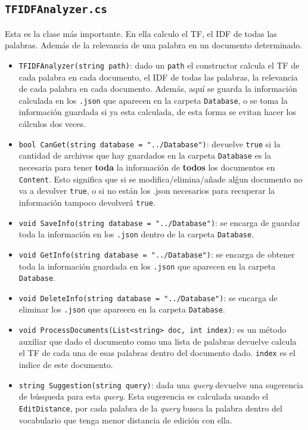\documentclass{report}
\begin{document}
\subsection*{\tt TFIDFAnalyzer.cs}

Esta es la clase m\'as importante. En ella calculo el TF, el IDF de todas las palabras. 
Adem\'as de la relevancia de una palabra en un documento determinado.

\begin{itemize}
	\item {\tt TFIDFAnalyzer(string path)}: dado un {\tt path} el constructor calcula el TF 
	de cada palabra en cada documento, el IDF de todas las palabras, la relevancia de cada 
	palabra en cada documento. Adem\'as, aqu\'i se guarda la informaci\'on calculada en los 
	{\tt .json} que aparecen en la carpeta {\tt Database}, o se toma la informaci\'on guardada 
	si ya esta calculada, de esta forma se evitan hacer los c\'alculos dos veces.
	\item {\tt bool CanGet(string database = "../Database")}: devuelve {\tt true} si la cantidad
de archivos que hay guardados en la carpeta {\tt Database} es la necesaria para tener {\bf toda} 
la informaci\'on de {\bf todos} los documentos en {\tt Content}. Esto significa que si se modifica/elimina/a\~nade 
al\'gun documento no va a devolver {\tt true}, o si no est\'an los {.json} necesarios
para recuperar la informaci\'on tampoco devolver\'a {\tt true}.
	\item {\tt void SaveInfo(string database = "../Database")}: se encarga de guardar toda la informaci\'on en los {\tt .json} dentro de la carpeta {\tt Database}.
	\item {\tt void GetInfo(string database = "../Database")}: se encarga de obtener toda la informaci\'on guardada en los {\tt .json} que aparecen en la carpeta {\tt Database}.
	\item {\tt void DeleteInfo(string database = "../Database")}: se encarga de eliminar los {\tt .json} que aparecen en la carpeta {\tt Database}.
	\item {\tt void ProcessDocuments(List<string> doc, int index)}: es un m\'etodo auxiliar que dado el documento como una lista de palabras devuelve calcula el TF de cada una de esas
palabras dentro del documento dado. {\tt index} es el indice de este documento.
	\item {\tt string Suggestion(string query)}: dada una {\it query} devuelve una sugerencia de b\'usqueda para esta {\it query}. Esta sugerencia es calculada 
	usando el {\tt EditDistance}, por cada palabra de la {\it query} busca la palabra dentro del vocabulario que tenga menor distancia de edici\'on con ella.

\end{itemize}
\end{document}
